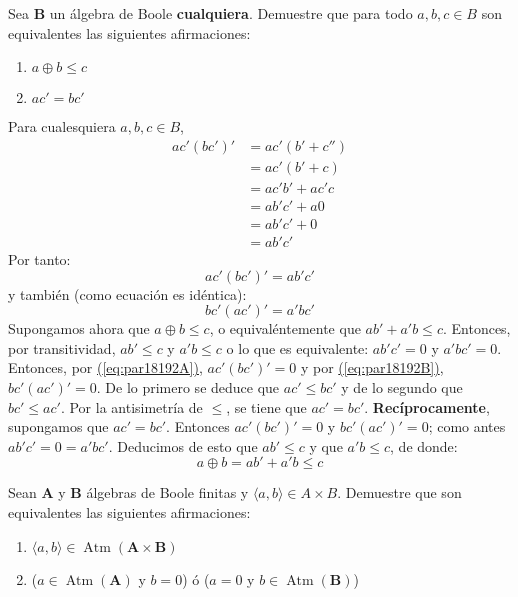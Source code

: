 \begin{exercise}
  Sea $\mathbf{B}$ un álgebra de Boole
  \textbf{cualquiera}. Demuestre que para todo $a,b,c\in B$ son
  equivalentes las siguientes afirmaciones:
  \begin{enumerate}
  \item $a\oplus b\leq c$
  \item $ac'=bc'$
  \end{enumerate}
\end{exercise}

\begin{solution}
  Para cualesquiera $a,b,c\in B$,
  \begin{align*}
    ac'(bc')'&=ac'(b'+c'')\\
             &=ac'(b'+c)\\
             &=ac'b'+ac'c\\
             &=ab'c'+a0\\
             &=ab'c'+0\\
             &=ab'c'
  \end{align*}
  Por tanto:
  \begin{equation}
    \label{eq:par18192A}
    ac'(bc')'=ab'c'
  \end{equation}
  y también (como ecuación es idéntica):
  \begin{equation}
    \label{eq:par18192B}
    bc'(ac')'=a'bc'
  \end{equation}
  Supongamos ahora que $a\oplus b\leq c$, o equivaléntemente que
  $ab'+a'b\leq c$. Entonces, por transitividad, $ab'\leq c$ y
  $a'b\leq c$ o lo que es equivalente: $ab'c'=0$ y
  $a'bc'=0$. Entonces, por
  \hyperref[eq:par18192A]{(\ref*{eq:par18192A})}, $ac'(bc')'=0$ y por
  \hyperref[eq:par18192B]{(\ref*{eq:par18192B})}, $bc'(ac')'=0$. De lo
  primero se deduce que $ac'\leq bc'$ y de lo segundo que
  $bc'\leq ac'$. Por la antisimetría de $\leq$, se tiene que
  $ac'=bc'$. \textbf{Recíprocamente}, supongamos que
  $ac'=bc'$. Entonces $ac'(bc')'=0$ y $bc'(ac')'=0$; como antes
  $ab'c'=0=a'bc'$. Deducimos de esto que $ab'\leq c$ y que $a'b\leq
  c$, de donde:
  \begin{equation*}
    a\oplus b = ab'+a'b\leq c
  \end{equation*}
\end{solution}

\begin{exercise}
  \label{it:atomosProd}
  Sean $\mathbf{A}$ y $\mathbf{B}$ álgebras
  de Boole finitas y $\langle a,b\rangle\in A\times B$. Demuestre que
  son equivalentes las siguientes afirmaciones:
  \begin{enumerate}
  \item
    $\langle a,b\rangle\in
    \operatorname{Atm}(\mathbf{A}\times\mathbf{B})$ \label{ex:atm_prod_A}
  \item ($a\in \operatorname{Atm}(\mathbf{A})$ y $b=0$) ó ($a=0$ y
    $b\in \operatorname{Atm}(\mathbf{B})$) \label{ex:atm_prod_B}
  \end{enumerate}
  \end{exercise}

